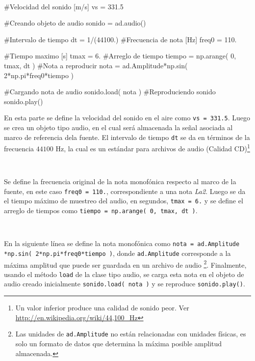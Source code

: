 \
\begin{listing}[style=python, numbers = none]
#Velocidad del sonido [m/s]
vs = 331.5

#Creando objeto de audio
sonido = ad.audio()

#Intervalo de tiempo
dt = 1/(44100.)
#Frecuencia de nota [Hz]
freq0 = 110.

#Tiempo maximo	[s]
tmax = 6.
#Arreglo de tiempo
tiempo = np.arange( 0, tmax, dt )
#Nota a reproducir
nota = ad.Amplitude*np.sin( 2*np.pi*freq0*tiempo )

#Cargando nota de audio
sonido.load( nota )
#Reproduciendo sonido
sonido.play()
\end{listing}
En esta parte se define la velocidad del sonido en el aire como 
\texttt{vs = 331.5}. Luego se crea un objeto tipo audio, en el cual será 
almacenada la señal asociada al marco de referencia dela fuente. El intervalo
de tiempo \texttt{dt} se da en términos de la frecuencia $44100$ Hz, la cual
es un estándar para archivos de audio (Calidad CD)\footnote{Un valor inferior
produce una calidad de sonido peor. Ver \url{http://en.wikipedia.org/wiki/44,100_Hz}}

\

Se define la frecuencia original de la nota monofónica respecto al marco
de la fuente, en este caso \texttt{freq0 = 110.}, correspondiente a 
una nota \textit{La2}. Luego se da el tiempo máximo de muestreo del audio,
en segundos, \texttt{tmax = 6.} y se define el arreglo de tiempos como
\texttt{tiempo = np.arange( 0, tmax, dt )}.

\

En la siguiente línea se define la nota monofónica como \texttt{nota = 
ad.Amplitude}
\texttt{*np.sin( 2*np.pi*freq0*tiempo )}, donde \texttt{ad.Amplitude}
corresponde a la máxima amplitud que puede ser guardada en un archivo 
de audio \footnote{Las unidades de \texttt{ad.Amplitude} no están 
relacionadas con unidades físicas, es solo un formato de datos que 
determina la máxima posible amplitud almacenada.}. Finalmente, usando
el método \texttt{load} de la clase tipo audio, se carga esta nota en el
objeto de audio creado inicialmente \texttt{sonido.load( nota )} y se 
reproduce \texttt{sonido.play()}.


